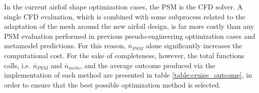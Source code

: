 In the current airfoil shape optimization cases, the PSM is the CFD 
solver. A single CFD evaluation, which is combined with some 
subprocess related to the adaptation of the mesh around the new 
airfoil design, is far more costly than any PSM evaluation 
performed in previous pseudo-engineering optimization cases and  
metamodel predictions. For this reason, $\overline{n}_{PSM}$ alone 
significantly increases the computational cost. For the sake of 
completeness, however, the total functions calls, i.e. 
$\overline{n}_{PSM}$ and $\overline{n}_{meta}$, and the average 
outcome produced via the implementation of each method are 
presented in table \ref{table:cruise_outcome}, in order to ensure 
that the best possible optimization method is selected.

\begin{table}[h!]
\centering
\caption{Comparison between all implemented optimization methods}
\label{table:cruise_outcome}
\end{table}

